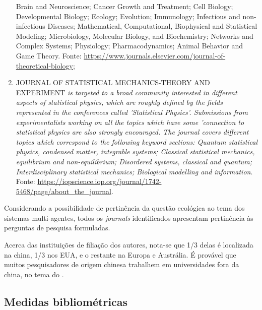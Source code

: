 \begin{enumerate}
{Brain and Neuroscience;
Cancer Growth and Treatment;
Cell Biology;
Developmental Biology;
Ecology;
Evolution;
Immunology;
Infectious and non-infectious Diseases;
Mathematical, Computational, Biophysical and Statistical Modeling;
Microbiology, Molecular Biology, and Biochemistry;
Networks and Complex Systems;
Physiology;
Pharmacodynamics;
Animal Behavior and Game Theory}. Fonte: \url{https://www.journals.elsevier.com/journal-of-theoretical-biology};
    \item JOURNAL OF STATISTICAL MECHANICS-THEORY AND EXPERIMENT \textit{\small is targeted to a broad community interested in different aspects of statistical physics, which are roughly defined by the fields represented in the conferences called 'Statistical Physics'. Submissions from experimentalists working on all the topics which have some 'connection to statistical physics are also strongly encouraged.
The journal covers different topics which correspond to the following keyword sections:
Quantum statistical physics, condensed matter, integrable systems;
Classical statistical mechanics, equilibrium and non-equilibrium;
Disordered systems, classical and quantum;
Interdisciplinary statistical mechanics;
Biological modelling and information}. Fonte: \url{https://iopscience.iop.org/journal/1742-5468/page/about_the_journal}.
\end{enumerate}
Considerando a possibilidade de pertinência da questão ecológica ao tema dos sistemas multi-agentes, todos os \textit{journals} identificados apresentam pertinência às perguntas de pesquisa formuladas. 

Acerca das instituições de filiação dos autores, nota-se que 1/3 delas é localizada na china, 1/3 nos EUA, e o restante na Europa e Austrália. É provável que muitos pesquisadores de origem chinesa trabalhem em universidades fora da china, no tema do \dataset.


\subsection{Medidas bibliométricas}

